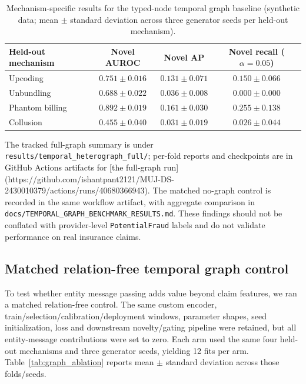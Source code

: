\documentclass[conference]{IEEEtran}
\begin{document}
\begin{table}[t]
\caption{Mechanism-specific results for the typed-node temporal graph baseline (synthetic data; mean $\pm$ standard deviation across three generator seeds per held-out mechanism).}
\label{tab:graph_mechanism}
\centering
\small
\begin{tabular}{lccc}
\toprule
Held-out mechanism & Novel AUROC & Novel AP & Novel recall ($\alpha=0.05$)\\
\midrule
Upcoding & $0.751\pm0.016$ & $0.131\pm0.071$ & $0.150\pm0.066$\\
Unbundling & $0.688\pm0.022$ & $0.036\pm0.008$ & $0.000\pm0.000$\\
Phantom billing & $0.892\pm0.019$ & $0.161\pm0.030$ & $0.255\pm0.138$\\
Collusion & $0.455\pm0.040$ & $0.031\pm0.019$ & $0.026\pm0.044$\\
\bottomrule
\end{tabular}
\end{table}

The tracked full-graph summary is under \texttt{results/temporal\_heterograph\_full/}; per-fold reports and checkpoints are in GitHub Actions artifacts for [the full-graph run](https://github.com/ishantpant2121/MUJ-DS-2430010379/actions/runs/40680366943). The matched no-graph control is recorded in the same workflow artifact, with aggregate comparison in \texttt{docs/TEMPORAL\_GRAPH\_BENCHMARK\_RESULTS.md}. These findings should not be conflated with provider-level \texttt{PotentialFraud} labels and do not validate performance on real insurance claims.

\subsection{Matched relation-free temporal graph control}
To test whether entity message passing adds value beyond claim features, we ran a matched relation-free control. The same custom encoder, train/selection/calibration/deployment windows, parameter shapes, seed initialization, loss and downstream novelty/gating pipeline were retained, but all entity-message contributions were set to zero. Each arm used the same four held-out mechanisms and three generator seeds, yielding 12 fits per arm. Table~\ref{tab:graph_ablation} reports mean $\pm$ standard deviation across those folds/seeds.
\end{document}
